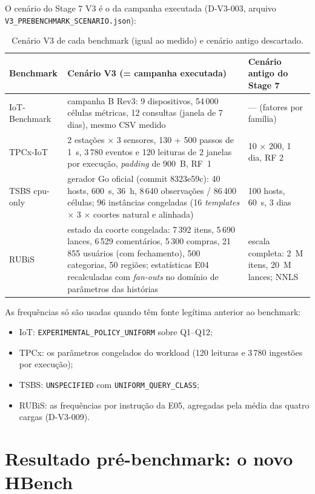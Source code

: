 \documentclass[10pt,a4paper,twoside]{article}
\theoremstyle{definition}\newtheorem{definicao}{Definição}
\begin{document}
O cenário do Stage 7 V3 é o da campanha executada (D-V3-003, arquivo \texttt{V3\_PREBENCHMARK\_SCENARIO.json}):

\begin{table}[H]\centering\small
\caption{Cenário V3 de cada benchmark (igual ao medido) e cenário antigo descartado.}
\begin{tabularx}{\linewidth}{lYY}
\toprule
Benchmark & Cenário V3 (= campanha executada) & Cenário antigo do Stage 7 \\
\midrule
IoT-Benchmark & campanha B Rev3: 9 dispositivos, 54\,000 células métricas, 12 consultas (janela de 7 dias), mesmo CSV medido & --- (fatores por família) \\
TPCx-IoT & 2 estações $\times$ 3 sensores, 130 + 500 passos de 1~s, 3\,780 eventos e 120 leituras de 2 janelas por execução, \emph{padding} de 900~B, RF~1 & 10 $\times$ 200, 1 dia, RF 2 \\
TSBS cpu-only & gerador Go oficial (commit 8323e59c): 40 hosts, 600~s, 36~h, 8\,640 observações / 86\,400 células; 96 instâncias congeladas (16 \emph{templates} $\times$ 3 $\times$ coortes natural e alinhada) & 100 hosts, 60~s, 3 dias \\
RUBiS & estado da coorte congelada: 7\,392 itens, 5\,690 lances, 6\,529 comentários, 5\,300 compras, 21\,855 usuários (com fechamento), 500 categorias, 50 regiões; estatísticas E04 recalculadas com \emph{fan-outs} no domínio de parâmetros das histórias & escala completa: 2~M itens, 20~M lances; NNLS \\
\bottomrule
\end{tabularx}
\end{table}

As frequências só são usadas quando têm fonte legítima anterior ao benchmark:
\begin{itemize}
\item IoT: \texttt{EXPERIMENTAL\_POLICY\_UNIFORM} sobre Q1--Q12;
\item TPCx: os parâmetros congelados do workload (120 leituras e 3\,780 ingestões por execução);
\item TSBS: \texttt{UNSPECIFIED} com \texttt{UNIFORM\_QUERY\_CLASS};
\item RUBiS: as frequências por instrução da E05, agregadas pela média das quatro cargas (D-V3-009).
\end{itemize}

\section{Resultado pré-benchmark: o novo HBench}
\label{sec:pre}
\end{document}
